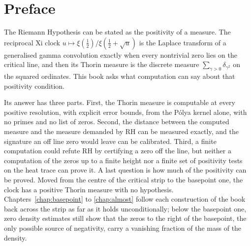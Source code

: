 \chapter*{Preface}

The Riemann Hypothesis can be stated as the positivity of a measure. The reciprocal Xi clock $u\mapsto\xi(\frac12)/\xi(\frac12+\sqrt u)$ is the Laplace transform of a generalised gamma convolution exactly when every nontrivial zero lies on the critical line, and then its Thorin measure is the discrete measure $\sum_{\gamma>0}\delta_{\gamma^2}$ on the squared ordinates. This book asks what computation can say about that positivity condition.

Its answer has three parts. First, the Thorin measure is computable at every positive resolution, with explicit error bounds, from the P\'olya kernel alone, with no primes and no list of zeros. Second, the distance between the computed measure and the measure demanded by RH can be measured exactly, and the signature an off line zero would leave can be calibrated. Third, a finite computation could refute RH by certifying a zero off the line, but neither a computation of the zeros up to a finite height nor a finite set of positivity tests on the heat trace can prove it. A last question is how much of the positivity can be proved. Moved from the centre of the critical strip to the basepoint one, the clock has a positive Thorin measure with no hypothesis. Chapters~\ref{chap:basepoint} to \ref{chap:almost} follow each construction of the book back across the strip as far as it holds unconditionally; below the basepoint one, zero density estimates still show that the zeros to the right of the basepoint, the only possible source of negativity, carry a vanishing fraction of the mass of the density.

